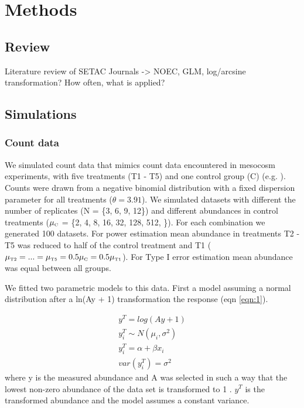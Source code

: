 \documentclass{scrartcl}\usepackage[]{graphicx}\usepackage[]{color}
\begin{document}
\section{Methods}
\subsection{Review}
Literature review of SETAC Journals -> NOEC, GLM, log/arcsine transformation? How often, what is applied?

\subsection{Simulations}
\subsubsection{Count data}
We simulated count data that mimics count data encountered in mesocosm experiments, with five treatments (T1 - T5) and one control group (C) (e.g. \citep{brock_minimum_2014}).
Counts were drawn from a negative binomial distribution with a fixed dispersion parameter for all treatments ($\theta = 3.91$).
We simulated datasets with different the number of replicates (N = \{3, 6, 9, 12\}) and different abundances in control treatments ($\mu_\text{\tiny C}$ = \{2, 4, 8, 16, 32, 128, 512, \}). 
For each combination we generated 100 datasets.
For power estimation mean abundance in treatments T2 - T5 was reduced to half of the control treatment and T1 ($\mu_\text{\tiny T2} = ... = \mu_\text{\tiny T5} = 0.5 \mu_\text{\tiny C} = 0.5 \mu_\text{\tiny T1} $).
For Type I error estimation mean abundance was equal between all groups.

We fitted two parametric models to this data.
First a model assuming a normal distribution after a ln(Ay + 1) transformation the response (eqn \ref{eqn:1}).

\begin{align}
  y^T = log(Ay + 1) \\
  y^T_i \sim N(\mu_i, \sigma^2) \nonumber \\
  y^T_i = \alpha + \beta x_i \label{eqn:1} \\
  var(y^T_i) = \sigma^2 \nonumber
\end{align}
where y is the measured abundance and A was selected in such a way that the lowest non-zero abundance of the data set is transformed to 1 \citep{van_den_brink_impact_2000}. 
$y^T$ is the transformed abundance and the model assumes a constant variance.
\end{document}
